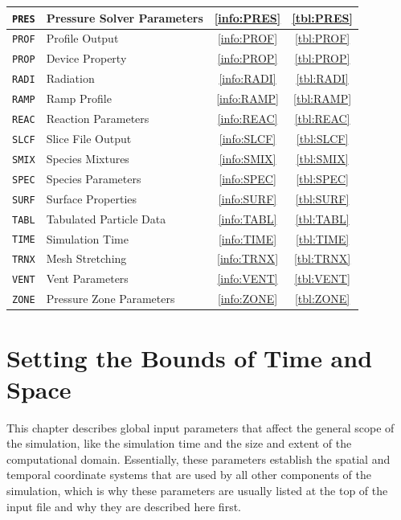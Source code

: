 \documentclass[11pt]{book}
\newcommand{\ct}{\tt\small}
\begin{document}
\begin{table}[ht]
\begin{center}
\begin{tabular}{|c|l|c|c|}
{\ct PRES}  & Pressure Solver Parameters   & \ref{info:PRES} & \ref{tbl:PRES}  \\ \hline
{\ct PROF}  & Profile Output               & \ref{info:PROF} & \ref{tbl:PROF}  \\ \hline
{\ct PROP}  & Device Property              & \ref{info:PROP} & \ref{tbl:PROP}  \\ \hline
{\ct RADI}  & Radiation                    & \ref{info:RADI} & \ref{tbl:RADI}  \\ \hline
{\ct RAMP}  & Ramp Profile                 & \ref{info:RAMP} & \ref{tbl:RAMP}  \\ \hline
{\ct REAC}  & Reaction Parameters          & \ref{info:REAC} & \ref{tbl:REAC}  \\ \hline
{\ct SLCF}  & Slice File Output            & \ref{info:SLCF} & \ref{tbl:SLCF}  \\ \hline
{\ct SMIX}  & Species Mixtures             & \ref{info:SMIX} & \ref{tbl:SMIX}  \\ \hline
{\ct SPEC}  & Species Parameters           & \ref{info:SPEC} & \ref{tbl:SPEC}  \\ \hline
{\ct SURF}  & Surface Properties           & \ref{info:SURF} & \ref{tbl:SURF}  \\ \hline
{\ct TABL}  & Tabulated Particle Data      & \ref{info:TABL} & \ref{tbl:TABL}  \\ \hline
{\ct TIME}  & Simulation Time              & \ref{info:TIME} & \ref{tbl:TIME}  \\ \hline
{\ct TRNX}  & Mesh Stretching              & \ref{info:TRNX} & \ref{tbl:TRNX}  \\ \hline
{\ct VENT}  & Vent Parameters              & \ref{info:VENT} & \ref{tbl:VENT}  \\ \hline
{\ct ZONE}  & Pressure Zone Parameters     & \ref{info:ZONE} & \ref{tbl:ZONE}  \\ \hline
\end{tabular}
\end{center}
\end{table}


\clearpage

\chapter{Setting the Bounds of Time and Space}

This chapter describes global input parameters that affect the general scope of the simulation, like
the simulation time and the size and extent of the computational domain. Essentially, these parameters
establish the spatial and temporal coordinate systems that are used by all other components of the simulation, which is
why these parameters are usually listed at the top of the input file and why they are described here first.
\end{document}

